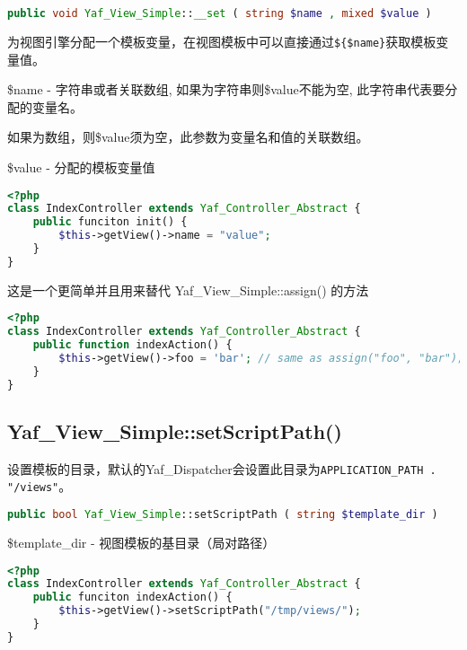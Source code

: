 \begin{lstlisting}[language=PHP]
public void Yaf_View_Simple::__set ( string $name , mixed $value )
\end{lstlisting}

为视图引擎分配一个模板变量，在视图模板中可以直接通过\texttt{\$\{\$name\}}获取模板变量值。

\begin{compactitem}
\item \$name - 字符串或者关联数组, 如果为字符串则\$value不能为空, 此字符串代表要分配的变量名。

如果为数组，则\$value须为空，此参数为变量名和值的关联数组。

\item \$value - 分配的模板变量值
\end{compactitem}

\begin{lstlisting}[language=PHP]
<?php
class IndexController extends Yaf_Controller_Abstract {
    public funciton init() {
        $this->getView()->name = "value";
    }
}
\end{lstlisting}




这是一个更简单并且用来替代 Yaf\_View\_Simple::assign() 的方法

\begin{lstlisting}[language=PHP]
<?php
class IndexController extends Yaf_Controller_Abstract {
    public function indexAction() {
        $this->getView()->foo = 'bar'; // same as assign("foo", "bar");
    }
}
\end{lstlisting}

\subsection{Yaf\_View\_Simple::setScriptPath()}

设置模板的目录，默认的Yaf\_Dispatcher会设置此目录为\texttt{APPLICATION\_PATH . "/views"}。

\begin{lstlisting}[language=PHP]
public bool Yaf_View_Simple::setScriptPath ( string $template_dir )
\end{lstlisting}


\begin{compactitem}
\item \$template\_dir - 视图模板的基目录（局对路径）
\end{compactitem}

\begin{lstlisting}[language=PHP]
<?php
class IndexController extends Yaf_Controller_Abstract {
    public funciton indexAction() {
        $this->getView()->setScriptPath("/tmp/views/");
    }
}
\end{lstlisting}

